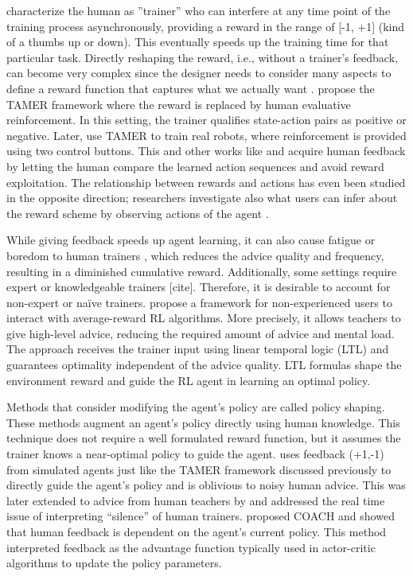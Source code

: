 \documentclass[twoside,11pt]{article}
\begin{document}
 \cite{Thomaz:2006:RLWithHumanTeachers} characterize the human as ''trainer'' who can interfere at any time point of the training process asynchronously, providing a reward in the range of [-1, +1] (kind of a thumbs up or down). This eventually speeds up the training time for that particular task. Directly reshaping the reward, i.e., without a trainer's feedback,  can become very complex since the designer needs to consider many aspects to define a reward function that captures what we actually want \citep{hadfield:17}.  \cite{Knox:2008:TAMER} propose the TAMER framework where the reward is replaced by human evaluative reinforcement. In this setting, the trainer qualifies state-action pairs as positive or negative. Later, \cite{knox:13} use TAMER to train real robots, where reinforcement is provided using two control buttons. This and other works like \cite{Christiano:2017:DeepRLHumanPreferences} and \cite{LeeSmithAbbeel:2021:FeedbackPreferenceHITLLearningPEBBLE} acquire human feedback by letting the human compare the learned action sequences and avoid reward exploitation. The relationship between rewards and actions has even been studied in the opposite direction; researchers investigate also what users can infer about the reward scheme by observing actions of the agent \citep{Abbeel:2004:InverseRL}. 

While giving feedback speeds up agent learning, it can also cause fatigue or boredom to human trainers \citep{akalin:21}, which reduces the advice quality and frequency, resulting in a diminished cumulative reward. Additionally, some settings require expert or knowledgeable trainers [cite]. Therefore, it is desirable to account for non-expert or na\"ive trainers. \cite{jiang:21} propose a framework for non-experienced users to interact with average-reward RL algorithms. More precisely, it allows teachers to give high-level advice, reducing the required amount of advice and mental load. The approach receives the trainer input using linear temporal logic (LTL) and guarantees optimality independent of the advice quality. LTL formulas shape the environment reward and guide the RL agent in learning an optimal policy.
  
Methods that consider modifying the agent's policy are called policy shaping. These methods augment an agent's policy directly using human knowledge. This technique does not require a well formulated reward function, but it assumes the trainer knows a near-optimal policy to guide the agent. \cite{griffith2013policy} uses feedback (+1,-1) from simulated agents just like the TAMER framework discussed previously to directly guide the agent’s policy and is oblivious to noisy human advice. This was later extended to advice from human teachers by \cite{cederborg2015policy} and addressed the real time issue of interpreting “silence” of human trainers. \cite{macglashan2017interactive} proposed COACH and showed that human feedback is dependent on the agent’s current policy. This method interpreted feedback as the advantage function typically used in actor-critic algorithms to update the policy parameters.
\end{document}
